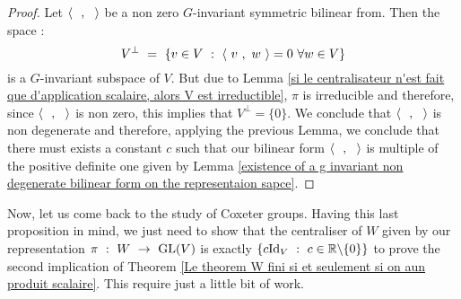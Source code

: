 \begin{proof}
	Let $\langle\text{ } \text{ },\text{ }\text{ }\rangle$ be a non zero $G$-invariant symmetric bilinear from. Then the space :
	\begin{equation}
	V^\perp\text{ }=\text{ } \{v\in V\text{ } :\text{ } \langle\text{ } v\text{ },\text{ } w\text{ }\rangle=0\text{ }\forall w\in V\}
	\end{equation}
	is a $G$-invariant subspace of $V$. But due to Lemma \ref{si le centralisateur n'est fait que d'application scalaire, alors V est irreductible}, $\pi$ is irreducible and therefore, since $\langle\text{ } \text{ },\text{ }\text{ }\rangle$ is non zero, this implies that $V^\perp=\{0\}$. We conclude that $\langle\text{ } \text{ },\text{ }\text{ }\rangle$ is non degenerate and therefore, applying the previous Lemma, we conclude that there must exists a constant $c$ such that our bilinear form $\langle\text{ } \text{ },\text{ }\text{ }\rangle$ is multiple of the positive definite one given by Lemma \ref{existence of a g invariant non degenerate bilinear form on the representaion sapce}.
\end{proof}

Now, let us come back to the study of Coxeter groups.
Having this last proposition in mind, we just need to show that the centraliser of $W$ given by our representation $\pi \text{ }:\text{ } W\text{ }\rightarrow\text{ }\mbox{GL}(V)$ is exactly $\{c\mbox{Id}_V\text{ }:\text{ } c\in \mathbb R\backslash\{0\}\}$ to prove the second implication of Theorem \ref{Le theorem W fini si et seulement si on  aun produit scalaire}. This require just a little bit of work.

